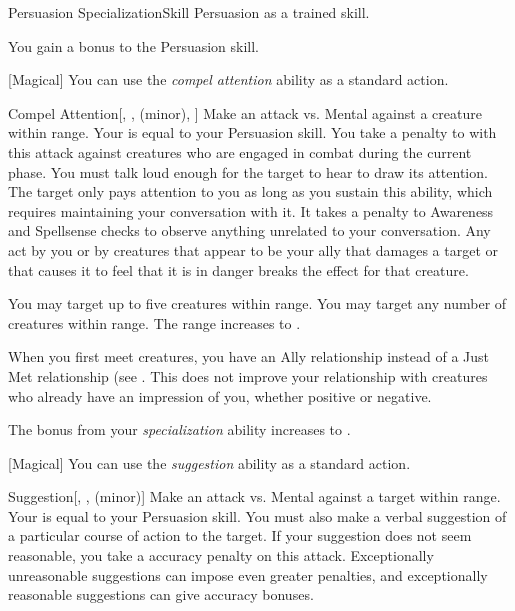     \begin{feat}{Persuasion Specialization}{Skill}
        \featpre Persuasion as a trained skill.

         You gain a  bonus to the Persuasion skill.

        [Magical] You can use the \textit{compel attention} ability as a standard action.
        \begin{freeability}{Compel Attention}[, ,  (minor), ]
            Make an attack vs. Mental against a creature within \rngmed range.
            Your  is equal to your Persuasion skill.
            You take a  penalty to  with this attack against creatures who are engaged in combat during the current phase.
            You must talk loud enough for the target to hear to draw its attention.
            \hit The target only pays attention to you as long as you sustain this ability, which requires maintaining your conversation with it.
            It takes a  penalty to Awareness and Spellsense checks to observe anything unrelated to your conversation.
            Any act by you or by creatures that appear to be your ally that damages a target or that causes it to feel that it is in danger breaks the effect for that creature.

            \rankline
             You may target up to five creatures within range.
             You may target any number of creatures within range.
             The range increases to \distrange.
        \end{freeability}

         When you first meet creatures, you have an Ally relationship instead of a Just Met relationship (see .
        This does not improve your relationship with creatures who already have an impression of you, whether positive or negative.

         The bonus from your \textit{specialization} ability increases to .

        [Magical] You can use the \textit{suggestion} ability as a standard action.
        \begin{freeability}{Suggestion}[, ,  (minor)]
            Make an attack vs. Mental against a target within \rngmed range.
            Your  is equal to your Persuasion skill.
            You must also make a verbal suggestion of a particular course of action to the target.
            If your suggestion does not seem reasonable, you take a  accuracy penalty on this attack.
            Exceptionally unreasonable suggestions can impose even greater penalties, and exceptionally reasonable suggestions can give accuracy bonuses.


\end{freeability}
\end{feat}
